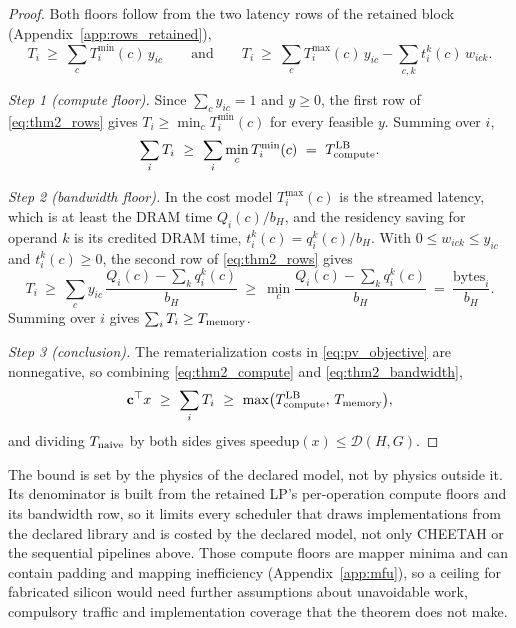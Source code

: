 \begin{proof}
Both floors follow from the two latency rows of the retained block (Appendix~\ref{app:rows_retained}),
\begin{equation}
T_i\ \ge\ \sum_c T^{\min}_i(c)\,y_{ic}
\qquad\text{and}\qquad
T_i\ \ge\ \sum_c T^{\max}_i(c)\,y_{ic}-\sum_{c,k}t^k_i(c)\,w_{ick}.
\label{eq:thm2_rows}
\end{equation}

\emph{Step 1 (compute floor).}
Since $\sum_cy_{ic}=1$ and $y\ge0$, the first row of \eqref{eq:thm2_rows} gives $T_i\ge\min_cT^{\min}_i(c)$ for every feasible $y$.
Summing over $i$,
\begin{equation}
\sum_iT_i\ \ge\ \sum_i\min_cT^{\min}_i(c)\ =\ T^{\rm LB}_{\rm compute}.
\label{eq:thm2_compute}
\end{equation}

\emph{Step 2 (bandwidth floor).}
In the cost model $T^{\max}_i(c)$ is the streamed latency, which is at least the DRAM time $Q_i(c)/b_H$, and the residency saving for operand $k$ is its credited DRAM time, $t^k_i(c)=q^k_i(c)/b_H$.
With $0\le w_{ick}\le y_{ic}$ and $t^k_i(c)\ge0$, the second row of \eqref{eq:thm2_rows} gives
\begin{equation}
T_i\ \ge\ \sum_c y_{ic}\,\frac{Q_i(c)-\sum_kq^k_i(c)}{b_H}
\ \ge\ \min_c\frac{Q_i(c)-\sum_kq^k_i(c)}{b_H}
\ =\ \frac{\mathrm{bytes}_i}{b_H}.
\label{eq:thm2_bandwidth}
\end{equation}
Summing over $i$ gives $\sum_iT_i\ge T_{\rm memory}$.

\emph{Step 3 (conclusion).}
The rematerialization costs in \eqref{eq:pv_objective} are nonnegative, so combining \eqref{eq:thm2_compute} and \eqref{eq:thm2_bandwidth},
\begin{equation*}
\mathbf c^\top x\ \ge\ \sum_iT_i\ \ge\ \max\bigl(T^{\rm LB}_{\rm compute},\,T_{\rm memory}\bigr),
\end{equation*}
and dividing $T_{\rm naive}$ by both sides gives $\mathrm{speedup}(x)\le\mathcal D(H,G)$.
\end{proof}
The bound is set by the physics of the declared model, not by physics outside it.
Its denominator is built from the retained LP's per-operation compute floors and its bandwidth row, so it limits every scheduler that draws implementations from the declared library and is costed by the declared model, not only CHEETAH or the sequential pipelines above.
Those compute floors are mapper minima and can contain padding and mapping inefficiency (Appendix~\ref{app:mfu}), so a ceiling for fabricated silicon would need further assumptions about unavoidable work, compulsory traffic and implementation coverage that the theorem does not make.
